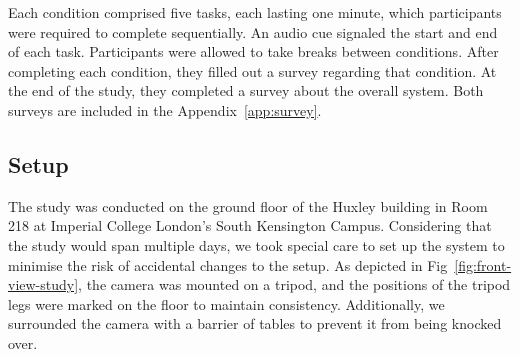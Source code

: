 Each condition comprised five tasks, each lasting one minute, which participants were required to complete sequentially. An audio cue signaled the start and end of each task. Participants were allowed to take breaks between conditions. After completing each condition, they filled out a survey regarding that condition. At the end of the study, they completed a survey about the overall system. Both surveys are included in the Appendix~\ref{app:survey}.
\subsection{Setup}

The study was conducted on the ground floor of the Huxley building in Room 218 at Imperial College London's South Kensington Campus. Considering that the study would span multiple days, we took special care to set up the system to minimise the risk of accidental changes to the setup. As depicted in Fig~\ref{fig:front-view-study}, the camera was mounted on a tripod, and the positions of the tripod legs were marked on the floor to maintain consistency. Additionally, we surrounded the camera with a barrier of tables to prevent it from being knocked over.

